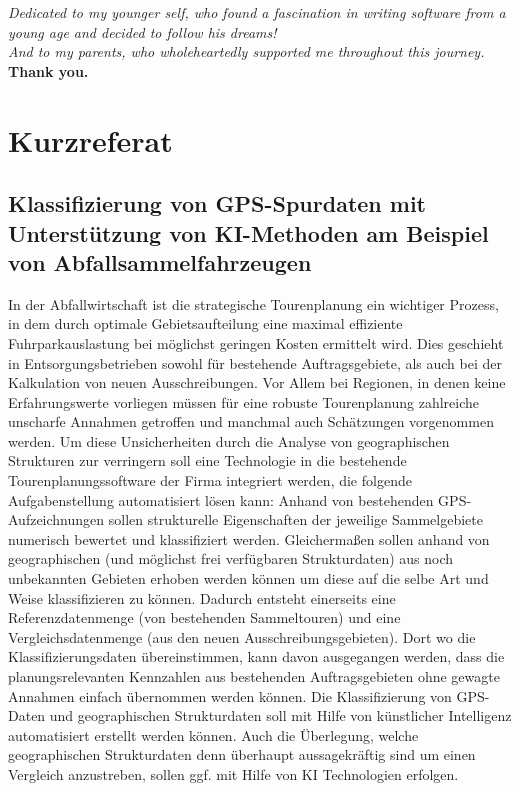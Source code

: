 \documentclass[a4paper,12pt,twoside]{scrreprt}
\begin{document}
\vspace{1cm}
\begin{center}
  \emph{Dedicated to my younger self, who found a fascination in writing
    software from
    a young age and decided to follow his dreams!}\\[0.5cm]
  \emph{And to my parents, who wholeheartedly supported me throughout this
    journey.}\\[0.5cm]
  \textbf{Thank you.}
\end{center}
\vspace{1cm}

\newpage
\section*{Kurzreferat}

\subsection*{Klassifizierung von GPS-Spurdaten mit Unterstützung von
  KI-Methoden am Beispiel von Abfallsammelfahrzeugen}

In der Abfallwirtschaft ist die strategische Tourenplanung ein wichtiger
Prozess, in dem durch optimale Gebietsaufteilung eine maximal effiziente
Fuhrparkauslastung bei möglichst geringen Kosten ermittelt wird. Dies geschieht
in Entsorgungsbetrieben sowohl für bestehende Auftragsgebiete, als auch bei der
Kalkulation von neuen Ausschreibungen. Vor Allem bei Regionen, in denen keine
Erfahrungswerte vorliegen müssen für eine robuste Tourenplanung zahlreiche
unscharfe Annahmen getroffen und manchmal auch Schätzungen vorgenommen werden.
Um diese Unsicherheiten durch die Analyse von geographischen Strukturen zur
verringern soll eine Technologie in die bestehende Tourenplanungssoftware der
Firma integriert werden, die folgende Aufgabenstellung automatisiert lösen
kann: Anhand von bestehenden GPS-Aufzeichnungen sollen strukturelle
Eigenschaften der jeweilige Sammelgebiete numerisch bewertet und klassifiziert
werden. Gleichermaßen sollen anhand von geographischen (und möglichst frei
verfügbaren Strukturdaten) aus noch unbekannten Gebieten erhoben werden können
um diese auf die selbe Art und Weise klassifizieren zu können. Dadurch entsteht
einerseits eine Referenzdatenmenge (von bestehenden Sammeltouren) und eine
Vergleichsdatenmenge (aus den neuen Ausschreibungsgebieten). Dort wo die
Klassifizierungsdaten übereinstimmen, kann davon ausgegangen werden, dass die
planungsrelevanten Kennzahlen aus bestehenden Auftragsgebieten ohne gewagte
Annahmen einfach übernommen werden können. Die Klassifizierung von GPS-Daten
und geographischen Strukturdaten soll mit Hilfe von künstlicher Intelligenz
automatisiert erstellt werden können. Auch die Überlegung, welche
geographischen Strukturdaten denn überhaupt aussagekräftig sind um einen
Vergleich anzustreben, sollen ggf. mit Hilfe von KI Technologien erfolgen.
\end{document}
